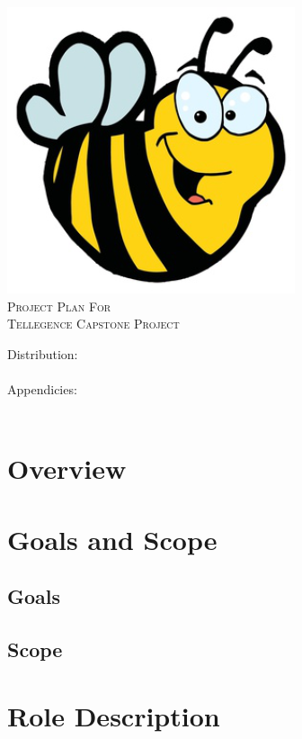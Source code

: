 \documentclass[12pt, letterpaper]{article}
\begin{document}
\begin{titlepage}

\begin{center}
\includegraphics[width=.5\textwidth]{./bee}\\[2cm]
\textsc{\LARGE Project Plan For}\\[1.5cm]
\textsc{\LARGE Tellegence Capstone Project}\\[1.5cm]
\end{center}

\begin{flushleft}
\large Distribution:\\
\hfill \\
\large Appendicies:\\
\hfill \\
\end{flushleft}

\vfill

\end{titlepage}

\tableofcontents
\pagebreak 

\section{Overview}

\section{Goals and Scope}
  \subsection*{Goals}
  \subsection*{Scope}
  
\section{Role Description}
\end{document}

